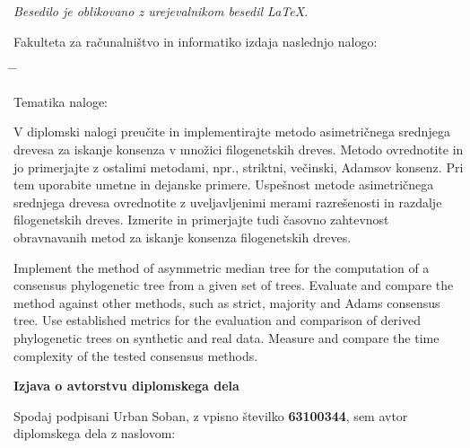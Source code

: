 \documentclass[a4paper, 12pt]{book}
\newcommand{\clearemptydoublepage}{\newpage{\pagestyle{empty}\cleardoublepage}}
\begin{document}
\begin{center}
\mbox{}\vfill
\emph{Besedilo je oblikovano z urejevalnikom besedil \LaTeX.}
\end{center}
\clearemptydoublepage

\thispagestyle{empty}
\vspace*{4cm}

\noindent
Fakulteta za računalništvo in informatiko izdaja naslednjo nalogo:
\medskip
\begin{tabbing}
\hspace{32mm}\= \hspace{6cm} \= \kill




Tematika naloge:
\end{tabbing}
V diplomski nalogi preučite in implementirajte metodo asimetričnega
srednjega drevesa za iskanje konsenza v množici filogenetskih dreves.
Metodo ovrednotite in jo primerjajte z ostalimi metodami, npr., striktni,
večinski, Adamsov konsenz. Pri tem uporabite umetne in dejanske primere.
Uspešnost metode asimetričnega srednjega drevesa ovrednotite z
uveljavljenimi merami razrešenosti in razdalje filogenetskih dreves.
Izmerite in primerjajte tudi časovno zahtevnost obravnavanih metod za
iskanje konsenza filogenetskih dreves.
\vspace{15mm}

\noindent Implement the method of asymmetric median tree for the computation of a
consensus phylogenetic tree from a given set of trees. Evaluate and compare
the method against other methods, such as strict, majority and Adams
consensus tree. Use established metrics for the evaluation and comparison
of derived phylogenetic trees on synthetic and real data. Measure and
compare the time complexity of the tested consensus methods.





\vspace{2cm}

\clearemptydoublepage

\vspace*{1cm}
\begin{center}
{\Large \textbf{\sc Izjava o avtorstvu diplomskega dela}}
\end{center}

\vspace{1cm}
\noindent Spodaj podpisani Urban Soban,
z vpisno številko \textbf{63100344}, sem avtor  diplomskega dela z naslovom:
\end{document}
